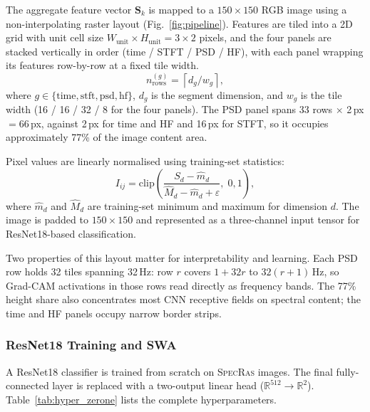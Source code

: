 \documentclass[preprint,12pt,3p]{elsarticle}
\let\cite\citep   %
\newcommand{\zerone}{\textsc{SpecRas}\xspace}      %
\newcommand{\R}{\mathbb{R}}
\begin{document}
The aggregate feature vector $\mathbf{S}_k$ is mapped to a
$150 \times 150$ RGB image using a non-interpolating raster layout
(Fig.~\ref{fig:pipeline}).
Features are tiled into a 2D grid with unit cell size $W_\mathrm{unit}
\times H_\mathrm{unit} = 3 \times 2$ pixels, and the four panels are
stacked vertically in order (time / STFT / PSD / HF), with each panel
wrapping its features row-by-row at a fixed tile width.
%
\begin{equation}
  n_\mathrm{rows}^{(g)} = \left\lceil d_g / w_g \right\rceil,
  \label{eq:raster_rows}
\end{equation}
where $g \in \{\text{time},\text{stft},\text{psd},\text{hf}\}$,
$d_g$ is the segment dimension, and $w_g$ is the tile width
(16 / 16 / 32 / 8 for the four panels).
The PSD panel spans 33 rows $\times$ 2\,px $= 66$\,px,
against 2\,px for time and HF and 16\,px for STFT, so it
occupies approximately 77\% of the image content area.

Pixel values are linearly normalised using training-set statistics:
%
\begin{equation}
  I_{ij} = \mathrm{clip}\!\left(
    \frac{S_d - \hat{m}_d}{\hat{M}_d - \hat{m}_d + \varepsilon},\; 0, 1
  \right),
  \label{eq:norm}
\end{equation}
%
where $\hat{m}_d$ and $\hat{M}_d$ are training-set minimum and maximum
for dimension $d$.
The image is padded to $150{\times}150$ and represented as a
three-channel input tensor for ResNet18-based classification.

Two properties of this layout matter for interpretability and learning.
Each PSD row holds 32 tiles spanning 32\,Hz: row $r$ covers
$1 + 32r$ to $32(r+1)$\,Hz, so Grad-CAM activations in those rows read
directly as frequency bands.
The 77\% height share also concentrates most CNN receptive fields on
spectral content; the time and HF panels occupy narrow border strips.

\subsubsection{ResNet18 Training and SWA}
\label{sec:resnet}

A ResNet18 \cite{he2016deep} classifier is trained from scratch on
\zerone images.
The final fully-connected layer is replaced with a two-output linear
head ($\R^{512} \to \R^2$).
Table~\ref{tab:hyper_zerone} lists the complete hyperparameters.
\end{document}
